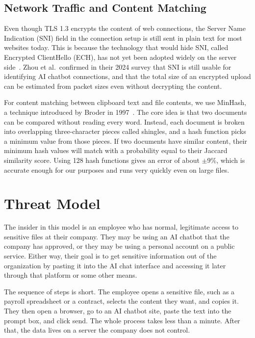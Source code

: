 \documentclass[conference]{IEEEtran}
\begin{document}
\subsection{Network Traffic and Content Matching}

Even though TLS 1.3 encrypts the content of web connections, the
Server Name Indication (SNI) field in the connection setup is still
sent in plain text for most websites today. This is because the
technology that would hide SNI, called Encrypted ClientHello (ECH),
has not yet been adopted widely on the server side~\cite{zhou2024tls}.
Zhou et al.\ confirmed in their 2024 survey that SNI is still usable
for identifying AI chatbot connections, and that the total size of an
encrypted upload can be estimated from packet sizes even without
decrypting the content.

For content matching between clipboard text and file contents, we use
MinHash, a technique introduced by Broder in 1997~\cite{broder1997minhash}.
The core idea is that two documents can be compared without reading
every word. Instead, each document is broken into overlapping
three-character pieces called shingles, and a hash function picks a
minimum value from those pieces. If two documents have similar content,
their minimum hash values will match with a probability equal to their
Jaccard similarity score. Using 128 hash functions gives an error of
about $\pm$9\%, which is accurate enough for our purposes and runs
very quickly even on large files.


\section{Threat Model}
\label{sec:threat}

The insider in this model is an employee who has normal, legitimate
access to sensitive files at their company. They may be using an
AI chatbot that the company has approved, or they may be using a
personal account on a public service. Either way, their goal is to get
sensitive information out of the organization by pasting it into the
AI chat interface and accessing it later through that platform or
some other means.

The sequence of steps is short. The employee opens a sensitive file,
such as a payroll spreadsheet or a contract, selects the content they
want, and copies it. They then open a browser, go to an AI chatbot
site, paste the text into the prompt box, and click send. The whole
process takes less than a minute. After that, the data lives on
a server the company does not control.
\end{document}
